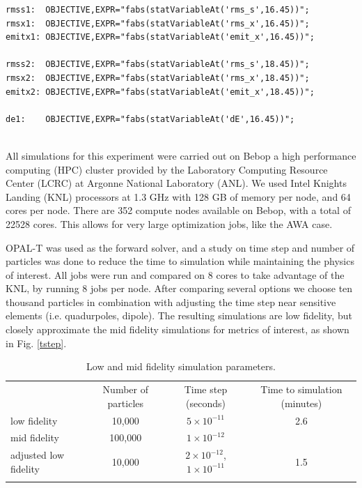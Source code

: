  \vspace{0.2cm}
 {\footnotesize \begin{verbatim}
rmss1:  OBJECTIVE,EXPR="fabs(statVariableAt('rms_s',16.45))";
rmsx1:  OBJECTIVE,EXPR="fabs(statVariableAt('rms_x',16.45))";
emitx1: OBJECTIVE,EXPR="fabs(statVariableAt('emit_x',16.45))";
 
rmss2:  OBJECTIVE,EXPR="fabs(statVariableAt('rms_s',18.45))";
rmsx2:  OBJECTIVE,EXPR="fabs(statVariableAt('rms_x',18.45))";
emitx2: OBJECTIVE,EXPR="fabs(statVariableAt('emit_x',18.45))";
 
de1:    OBJECTIVE,EXPR="fabs(statVariableAt('dE',16.45))";
 
	\end{verbatim}}
\vspace{0.2cm}

All simulations for this experiment were carried out on Bebop a
high performance computing (HPC)
cluster provided by the Laboratory Computing Resource Center (LCRC)
at Argonne National Laboratory (ANL). We used Intel Knights Landing 
(KNL) processors at 1.3 GHz with 128 GB of memory per node, 
and 64 cores per node. There are 352 compute nodes available on 
Bebop, with a total of 22528 cores. 
This allows for very large optimization jobs, like the AWA case.

OPAL-T was used as the forward solver, and a study on time step and 
number of particles was done to reduce the time to simulation while 
maintaining the physics of interest. All jobs were run and compared 
on 8 cores to take advantage of the KNL, by running 8 jobs per node.
After comparing several options we choose ten thousand particles 
in combination with adjusting the time step near sensitive elements 
(i.e. quadurpoles, dipole). 
The resulting simulations are low fidelity, but closely approximate 
the mid fidelity simulations for metrics of interest, as shown in 
Fig. \ref{tstep}.

\begin{table}[h!]
	\begin{center}
		\caption{Low and mid fidelity simulation parameters.}
		\label{fidelity}
		\begin{tabular}{l ccc}
			\hline\noalign{\smallskip}
			 & Number of particles & Time step (seconds) & Time to simulation (minutes)\\
			\noalign{\smallskip}\hline\noalign{\smallskip}
			low fidelity  			&  10,000   & $5 \times10^{-11}$  &  2.6 \\
			mid fidelity 			&  100,000  & $1 \times 10^{-12}$ &  \\
			adjusted low fidelity  	&  10,000   & $2 \times 10^{-12}$, $1 \times 10^{-11}$ & 1.5 \\
			\noalign{\smallskip}\hline
		\end{tabular}
	\end{center}
\end{table}

